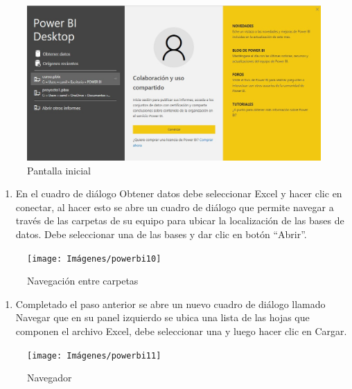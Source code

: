\documentclass[
]{book}
\providecommand{\tightlist}{%
  \setlength{\itemsep}{0pt}\setlength{\parskip}{0pt}}
\begin{document}
\begin{figure}

{\centering \includegraphics[width=0.8\linewidth]{Imágenes/powerbi9} 

}

\caption{Pantalla inicial}\label{fig:conexiondatos1-fig}
\end{figure}

\begin{enumerate}
\def\labelenumi{\arabic{enumi}.}
\setcounter{enumi}{1}
\tightlist
\item
  En el cuadro de diálogo Obtener datos debe seleccionar Excel y hacer clic en conectar, al hacer esto se abre un cuadro de diálogo que permite navegar a través de las carpetas de su equipo para ubicar la localización de las bases de datos. Debe seleccionar una de las bases y dar clic en botón ``Abrir''.
\end{enumerate}

\begin{figure}

{\centering \texttt{[image: Imágenes/powerbi10]} 

}

\caption{Navegación entre carpetas}\label{fig:conexiondatos2-fig}
\end{figure}

\begin{enumerate}
\def\labelenumi{\arabic{enumi}.}
\setcounter{enumi}{2}
\tightlist
\item
  Completado el paso anterior se abre un nuevo cuadro de diálogo llamado Navegar que en su panel izquierdo se ubica una lista de las hojas que componen el archivo Excel, debe seleccionar una y luego hacer clic en Cargar.
\end{enumerate}

\begin{figure}

{\centering \texttt{[image: Imágenes/powerbi11]} 

}

\caption{Navegador}\label{fig:conexiondatos3-fig}
\end{figure}
\end{document}

